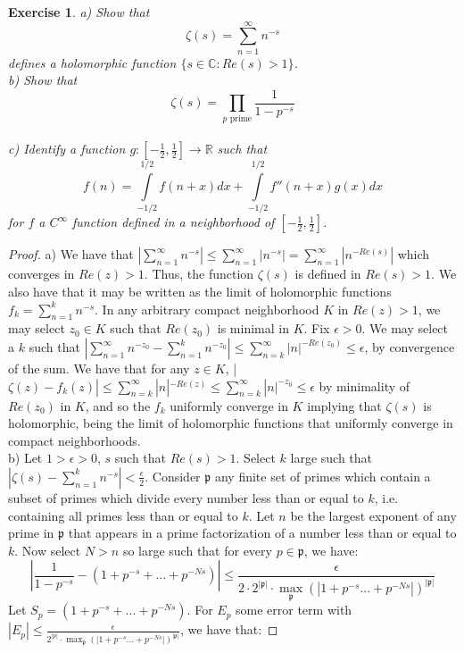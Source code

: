 \documentclass{article}
\newcommand{\bb}[1]{\mathbb{#1}}
\newcommand{\fk}[1]{\mathfrak{#1}}
\newtheorem{exercise}{Exercise}
\begin{document}
\begin{exercise}
  a) Show that
  \[
    \zeta(s) = \sum_{n=1}^{\infty}n^{-s}
  \]
  defines a holomorphic function $\{s \in \bb{C} : Re(s) > 1 \}$. \\
  b) Show that
  \[
    \zeta(s) = \prod_{p \text{ prime}}\frac{1}{1-p^{-s}}
  \] \\
  c) Identify a function $g: [-\frac{1}{2}, \frac{1}{2}] \to \bb{R}$ such that
  \[
    f(n) = \int\limits_{-1/2}^{1/2}f(n+x)dx + \int\limits_{-1/2}^{1/2}f''(n+x)g(x)dx
  \]
  for $f$ a $C^{\infty}$ function defined in a neighborhood of $[-\frac{1}{2}, \frac{1}{2}]$.
  \end{exercise}
  \begin{proof}
    a) We have that $|\sum_{n=1}^{\infty} n^{-s}| \leq \sum_{n=1}^{\infty}|n^{-s}| = \sum_{n=1}^{\infty}|n^{-Re(s)}|$ which converges in $Re(z) > 1$.  Thus, the function $\zeta(s)$ is defined in $Re(s)>1$. We also have that it may be written as the limit of holomorphic functions $f_{k} = \sum_{n=1}^{k}n^{-s}$. In any arbitrary compact neighborhood $K$ in $Re(z)>1$, we may select $z_{0} \in K$ such that $Re(z_{0})$ is minimal in $K$. Fix $\epsilon>0$. We may select a $k$ such that $|\sum_{n=1}^{\infty}n^{-z_{0}} - \sum_{n=1}^{k}n^{-z_{0}}| \leq \sum_{n=k}^{\infty}|n|^{-Re(z_{0})} \leq \epsilon$, by convergence of the sum. We have that for any $z \in K$, |$\zeta(z) - f_{k}(z)| \leq \sum_{n=k}^{\infty}|n|^{-Re(z)} \leq \sum_{n=k}^{\infty}|n|^{-z_{0}} \leq \epsilon$ by minimality of $Re(z_{0})$ in $K$, and so the $f_{k}$ uniformly converge in $K$ implying that $\zeta(s)$ is holomorphic, being the limit of holomorphic functions that uniformly converge in compact neighborhoods. \\    b) Let $1 > \epsilon > 0$, $s$ such that $Re(s) > 1$. Select $k$ large such that $|\zeta(s) - \sum_{n=1}^{k}n^{-s}| < \frac{\epsilon}{2}$. Consider $\fk{p}$ any finite set of primes which contain a subset of primes which divide every number less than or equal to $k$, i.e. containing all primes less than or equal to $k$. Let $n$ be the largest exponent of any prime in $\fk{p}$ that appears in a prime factorization of a number less than or equal to $k$. Now select $N > n$ so large such that for every $p \in \fk{p}$, we have:
    \[
      \left|\frac{1}{1-p^{-s}} - (1 + p^{-s} + ... + p^{-Ns})\right| \leq \frac{\epsilon}{2 \cdot 2^{|\fk{p}|}\cdot \max_{\fk{p}}(|1 + p^{-s} ... + p^{-Ns}|)^{|\fk{p}|}}
    \]
    Let $S_{p} = (1 + p^{-s} + ... + p^{-Ns})$. For $E_{p}$ some error term with $|E_{p}| \leq \frac{\epsilon}{2^{\fk|p|} \cdot \max_{\fk{p}}(|1 + p^{-s} ... + p^{-Ns}|)^{|\fk{p}|}}$, we have that:

\end{proof}
\end{document}
